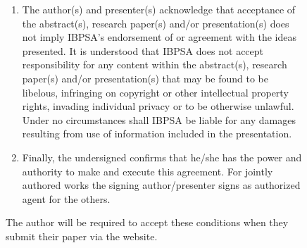 \documentclass[twocolumn, a4paper,10pt]{article}
\begin{document}
\begin{figure}[ht]
\begin{boxedminipage}{\textwidth}
\begin{enumerate}
  \item The author(s) and presenter(s) acknowledge that acceptance of the abstract(s), research paper(s) and/or presentation(s) does not imply IBPSA's endorsement of or agreement with the ideas presented. It is understood that IBPSA does not accept responsibility for any content within the abstract(s), research paper(s) and/or presentation(s) that may be found to be libelous, infringing on copyright or other intellectual property rights, invading individual privacy or to be otherwise unlawful. Under no circumstances shall IBPSA be liable for any damages resulting from use of information included in the presentation.
   
  \item Finally, the undersigned confirms that he/she has the power and authority to make and execute this agreement. For jointly authored works the signing author/presenter signs as authorized agent for the others.
  \end{enumerate}

\end{boxedminipage}
\caption{The author will be required to accept these conditions when they submit their paper via the website.}
\label{fig:fig02}
\end{figure}
\end{document}
